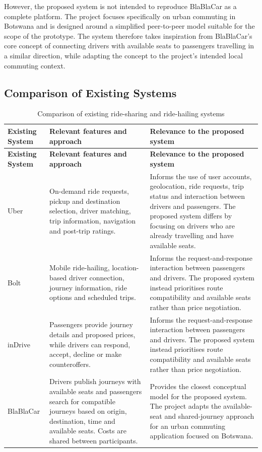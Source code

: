 However, the proposed system is not intended to reproduce BlaBlaCar as a complete platform. The project focuses specifically on urban commuting in Botswana and is designed around a simplified peer-to-peer model suitable for the scope of the prototype. The system therefore takes inspiration from BlaBlaCar's core concept of connecting drivers with available seats to passengers travelling in a similar direction, while adapting the concept to the project's intended local commuting context.

\subsection*{Comparison of Existing Systems}

\begingroup\small
\begin{longtable}{@{}>{\raggedright\arraybackslash}p{}
                   >{\raggedright\arraybackslash}p{}
                   >{\raggedright\arraybackslash}p{}@{}}
\caption{Comparison of existing ride-sharing and ride-hailing systems}\label{tab:comparison}\\
\toprule
\textbf{Existing System} & \textbf{Relevant features and approach} & \textbf{Relevance to the proposed system} \\
\midrule
\endfirsthead
\toprule
\textbf{Existing System} & \textbf{Relevant features and approach} & \textbf{Relevance to the proposed system} \\
\midrule
\endhead
\bottomrule
\endfoot
Uber & On-demand ride requests, pickup and destination selection, driver matching, trip information, navigation and post-trip ratings. & Informs the use of user accounts, geolocation, ride requests, trip status and interaction between drivers and passengers. The proposed system differs by focusing on drivers who are already travelling and have available seats. \\
\addlinespace
Bolt & Mobile ride-hailing, location-based driver connection, journey information, ride options and scheduled trips. & Informs the request-and-response interaction between passengers and drivers. The proposed system instead prioritises route compatibility and available seats rather than price negotiation. \\
\addlinespace
inDrive & Passengers provide journey details and proposed prices, while drivers can respond, accept, decline or make counteroffers. & Informs the request-and-response interaction between passengers and drivers. The proposed system instead prioritises route compatibility and available seats rather than price negotiation. \\
\addlinespace
BlaBlaCar & Drivers publish journeys with available seats and passengers search for compatible journeys based on origin, destination, time and available seats. Costs are shared between participants. & Provides the closest conceptual model for the proposed system. The project adapts the available-seat and shared-journey approach for an urban commuting application focused on Botswana. \\
\end{longtable}
\endgroup

